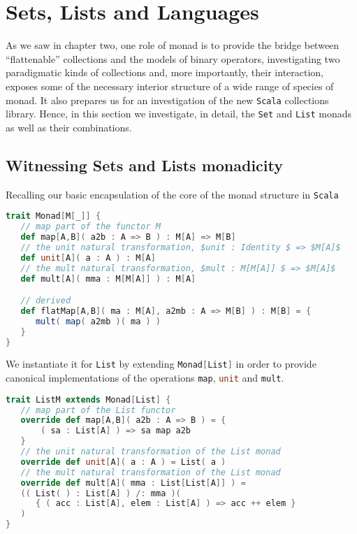 \section{Sets, Lists and Languages}

As we saw in chapter two, one role of monad is to provide the bridge
between ``flattenable'' collections and the models of binary
operators, investigating two paradigmatic kinds of collections and,
more importantly, their interaction, exposes some of the necessary
interior structure of a wide range of species of monad. It also
prepares us for an investigation of the new \texttt{Scala} collections
library. Hence, in this section we investigate, in detail, the
\lstinline[language=Scala,mathescape=true]!Set! and
\lstinline[language=Scala,mathescape=true]!List! monads as well as
their combinations.

\subsection{Witnessing Sets and Lists monadicity}

Recalling our basic encapsulation of the core of the monad structure
in \texttt{Scala}

\break
\begin{lstlisting}[language=Scala,mathescape=true]
trait Monad[M[_]] {
   // map part of the functor M
   def map[A,B]( a2b : A => B ) : M[A] => M[B]   
   // the unit natural transformation, $unit : Identity $ => $M[A]$
   def unit[A]( a : A ) : M[A]
   // the mult natural transformation, $mult : M[M[A]] $ => $M[A]$   
   def mult[A]( mma : M[M[A]] ) : M[A]

   // derived
   def flatMap[A,B]( ma : M[A], a2mb : A => M[B] ) : M[B] = {
      mult( map( a2mb )( ma ) )
   }
}
\end{lstlisting}

\break

We instantiate it for \lstinline[language=Scala,mathescape=true]!List!
by extending \lstinline[language=Scala,mathescape=true]!Monad[List]!
in order to provide canonical implementations of the operations
\lstinline[language=Scala,mathescape=true]!map!,
\lstinline[language=Scala,mathescape=true]!unit! and
\lstinline[language=Scala,mathescape=true]!mult!.

\begin{lstlisting}[language=Scala,mathescape=true]
trait ListM extends Monad[List] {  
   // map part of the List functor
   override def map[A,B]( a2b : A => B ) = {
       ( sa : List[A] ) => sa map a2b
   }   
   // the unit natural transformation of the List monad
   override def unit[A]( a : A ) = List( a )
   // the mult natural transformation of the List monad
   override def mult[A]( mma : List[List[A]] ) =
   (( List( ) : List[A] ) /: mma )(
      { ( acc : List[A], elem : List[A] ) => acc ++ elem }
   )
}
\end{lstlisting}

